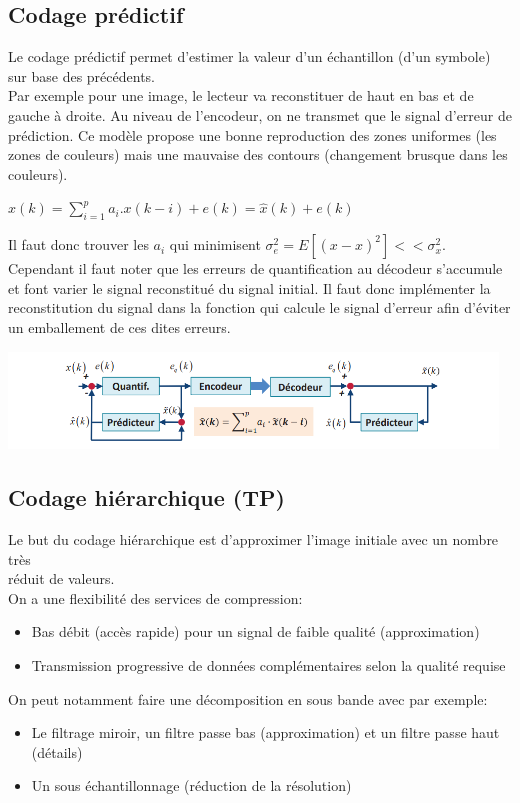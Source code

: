 \documentclass[a4paper,12pt,oneside]{report}	%
\begin{document}
        \subsection{Codage prédictif}
            \colorbox{bright-blue}{Le codage prédictif permet d'estimer la valeur d'un échantillon (d'un symbole) sur base} \colorbox{bright-blue}{des précédents.}\\
            Par exemple pour une image, le lecteur va reconstituer de haut en bas et de gauche à droite. Au niveau de l'encodeur, on ne transmet que le signal d'erreur de prédiction. Ce modèle propose une bonne reproduction des zones uniformes (les zones de couleurs) mais une mauvaise des contours (changement brusque dans les couleurs).
            \begin{center}
                $x(k)=\sum_{i=1}^p a_i.x(k-i)+e(k) = \hat{x}(k) + e(k)$
            \end{center}
            Il faut donc trouver les $a_i$ qui minimisent $\sigma_e^2=E[(x-\hat{x})^2]<<\sigma_x^2$.\\
            Cependant il faut noter que les erreurs de quantification au décodeur s'accumule et font varier le signal reconstitué du signal initial. Il faut donc implémenter la reconstitution du signal dans la fonction qui calcule le signal d'erreur afin d'éviter un emballement de ces dites erreurs.
            \begin{center}
                \includegraphics[width=13cm]{LaTeX/pictures/1.1.3_2.png}
            \end{center}
        \subsection{Codage hiérarchique (TP)}
            \colorbox{bright-blue}{Le but du codage hiérarchique est d'approximer l'image initiale avec un nombre très}\\ \colorbox{bright-blue}{réduit de valeurs.}\\
            On a une flexibilité des services de compression:
            \begin{itemize}
                \item Bas débit (accès rapide) pour un signal de faible qualité (approximation)
                \item Transmission progressive de données complémentaires selon la qualité requise
            \end{itemize}
            On peut notamment faire une décomposition en sous bande avec par exemple:
            \begin{itemize}
                \item Le filtrage miroir, un filtre passe bas (approximation) et un filtre passe haut (détails)
                \item Un sous échantillonnage (réduction de la résolution)
            \end{itemize}
\newpage
\end{document}

